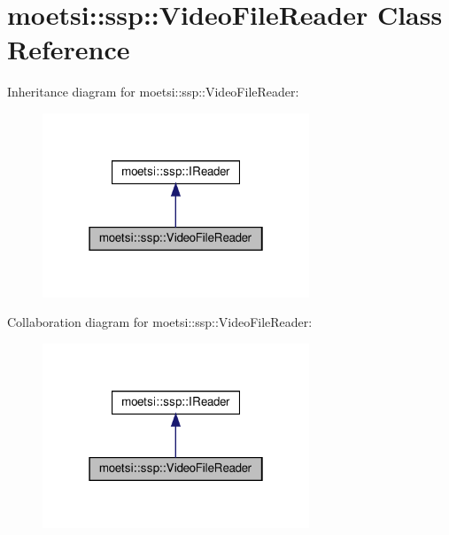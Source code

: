 \hypertarget{classmoetsi_1_1ssp_1_1VideoFileReader}{}\section{moetsi\+:\+:ssp\+:\+:Video\+File\+Reader Class Reference}
\label{classmoetsi_1_1ssp_1_1VideoFileReader}


Inheritance diagram for moetsi\+:\+:ssp\+:\+:Video\+File\+Reader\+:
\nopagebreak
\begin{figure}[H]
\begin{center}
\leavevmode
\includegraphics[width=226pt]{classmoetsi_1_1ssp_1_1VideoFileReader__inherit__graph}
\end{center}
\end{figure}


Collaboration diagram for moetsi\+:\+:ssp\+:\+:Video\+File\+Reader\+:
\nopagebreak
\begin{figure}[H]
\begin{center}
\leavevmode
\includegraphics[width=226pt]{classmoetsi_1_1ssp_1_1VideoFileReader__coll__graph}
\end{center}
\end{figure}
